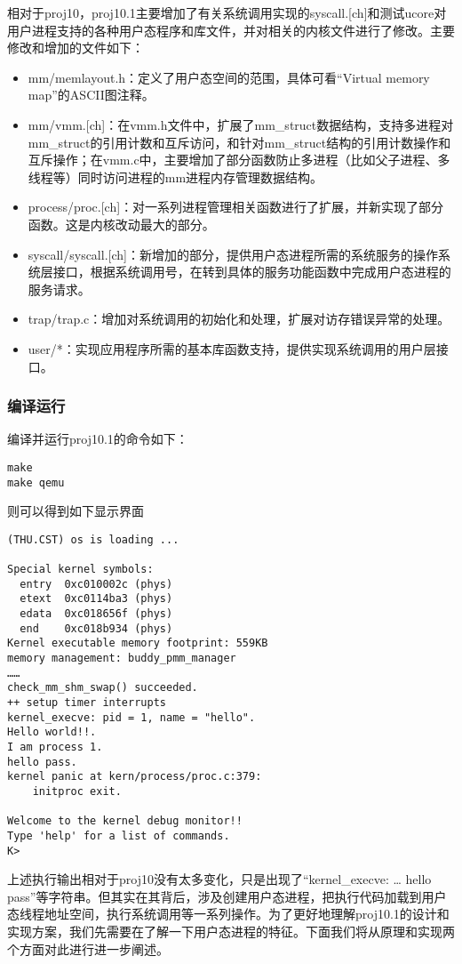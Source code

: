 相对于proj10，proj10.1主要增加了有关系统调用实现的syscall.{[}ch{]}和测试ucore对用户进程支持的各种用户态程序和库文件，并对相关的内核文件进行了修改。主要修改和增加的文件如下：

\begin{itemize}
\item
  mm/memlayout.h：定义了用户态空间的范围，具体可看``Virtual memory
  map''的ASCII图注释。
\item
  mm/vmm.{[}ch{]}：在vmm.h文件中，扩展了mm\_struct数据结构，支持多进程对mm\_struct的引用计数和互斥访问，和针对mm\_struct结构的引用计数操作和互斥操作；在vmm.c中，主要增加了部分函数防止多进程（比如父子进程、多线程等）同时访问进程的mm进程内存管理数据结构。
\item
  process/proc.{[}ch{]}：对一系列进程管理相关函数进行了扩展，并新实现了部分函数。这是内核改动最大的部分。
\item
  syscall/syscall.{[}ch{]}：新增加的部分，提供用户态进程所需的系统服务的操作系统层接口，根据系统调用号，在转到具体的服务功能函数中完成用户态进程的服务请求。
\item
  trap/trap.c：增加对系统调用的初始化和处理，扩展对访存错误异常的处理。
\item
  user/*：实现应用程序所需的基本库函数支持，提供实现系统调用的用户层接口。
\end{itemize}

\subsubsection{编译运行}\label{ux7f16ux8bd1ux8fd0ux884c}

编译并运行proj10.1的命令如下：

\begin{lstlisting}
make
make qemu
\end{lstlisting}

则可以得到如下显示界面

\begin{lstlisting}
(THU.CST) os is loading ...

Special kernel symbols:
  entry  0xc010002c (phys)
  etext  0xc0114ba3 (phys)
  edata  0xc018656f (phys)
  end    0xc018b934 (phys)
Kernel executable memory footprint: 559KB
memory management: buddy_pmm_manager
……
check_mm_shm_swap() succeeded.
++ setup timer interrupts
kernel_execve: pid = 1, name = "hello".
Hello world!!.
I am process 1.
hello pass.
kernel panic at kern/process/proc.c:379:
    initproc exit.

Welcome to the kernel debug monitor!!
Type 'help' for a list of commands.
K>
\end{lstlisting}

上述执行输出相对于proj10没有太多变化，只是出现了``kernel\_execve:
\ldots{} hello
pass''等字符串。但其实在其背后，涉及创建用户态进程，把执行代码加载到用户态线程地址空间，执行系统调用等一系列操作。为了更好地理解proj10.1的设计和实现方案，我们先需要在了解一下用户态进程的特征。下面我们将从原理和实现两个方面对此进行进一步阐述。

